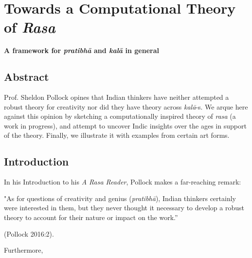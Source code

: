 \chapter[Towards a Computational Theory of \textsl{Rasa}]{Towards a Computational Theory of \textsl{Rasa}}\label{chapter\thechapter:begin}

\begin{center}
{\bf A framework for \textsl{pratibhā} and \textsl{kalā} in general}
\end{center}


\section*{Abstract}

Prof. Sheldon Pollock opines that Indian thinkers have neither attempted a robust theory for creativity nor did they have theory across \hbox{\textsl{kalā}-s}. We arque here against this opinion by sketching a computationally inspired theory of \textsl{rasa} (a work in progress), and attempt to uncover Indic insights over the ages in support of the theory. Finally, we illustrate it with examples from certain art forms.

\section{Introduction}\label{chap3-sec1}

In his Introduction to his \textsl{A Rasa Reader}, Pollock makes a far-reaching remark:

\begin{myquote}
"As for questions of creativity and genius (\textsl{pratibhā}), Indian thinkers certainly were interested in them, but they never thought it necessary to develop a robust theory to account for their nature or impact on the work.” 

\hfill (Pollock 2016:2).
\end{myquote}

Furthermore, 

